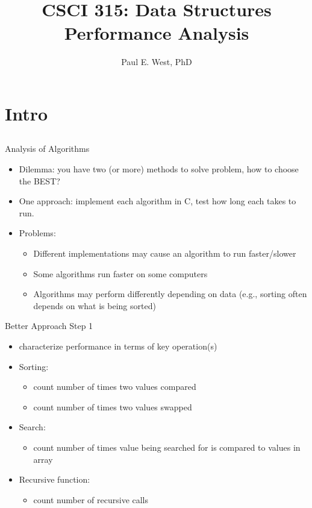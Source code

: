 \documentclass{beamer}
\title{CSCI 315: Data Structures \\ Performance Analysis}
\author{Paul E. West, PhD}
\institute{
  Department of Computer Science\\
  Charleston Southern University
}
\begin{document}
\begin{frame}
  \titlepage
\end{frame}

\section{Intro}
\subsection{}


\begin{frame}{Analysis of Algorithms}
\begin{itemize}
\item Dilemma:  you have two (or more) methods to solve problem, how to choose the BEST?
\item One approach: implement each algorithm in C, test how long each takes to run.
\item Problems:
\begin{itemize}
\item Different implementations may cause an algorithm to run faster/slower
\item Some algorithms run faster on some computers
\item Algorithms may perform differently depending on data (e.g., sorting often depends on what is being sorted)
\end{itemize}
\end{itemize}
\end{frame}

\begin{frame}{Better Approach Step 1}
\begin{itemize}
\item characterize performance in terms of key operation(s)
\item Sorting:
\begin{itemize}
\item count number of times two values compared
\item count number of times two values swapped
\end{itemize}
\item Search:
\begin{itemize}
\item count number of times value being searched for is compared to values in array
\end{itemize}
\item Recursive function:
\begin{itemize}
\item count number of recursive calls
\end{itemize}
\end{itemize}
\end{frame}
\end{document}
